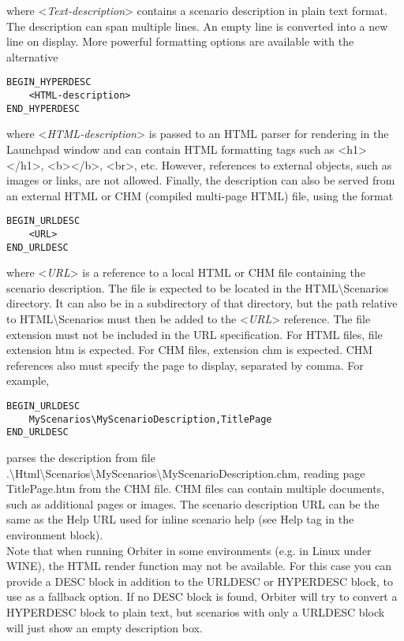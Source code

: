 \documentclass[Orbiter Developer Manual.tex]{subfiles}
\begin{document}
\noindent
where <\textit{Text-description}> contains a scenario description in plain text format. The description can span multiple lines. An empty line is converted into a new line on display. More powerful formatting options are available with the alternative

\begin{lstlisting}[language=OSFS]
BEGIN_HYPERDESC
	<HTML-description>
END_HYPERDESC
\end{lstlisting}

\noindent
where <\textit{HTML-description}> is passed to an HTML parser for rendering in the Launchpad window and can contain HTML formatting tags such as <h1></h1>, <b></b>, <br>, etc. However, references to external objects, such as images or links, are not allowed.
Finally, the description can also be served from an external HTML or CHM (compiled multi-page HTML) file, using the format

\begin{lstlisting}[language=OSFS]
BEGIN_URLDESC
	<URL>
END_URLDESC
\end{lstlisting}

\noindent
where <\textit{URL}> is a reference to a local HTML or CHM file containing the scenario description. The file is expected to be located in the HTML\textbackslash Scenarios directory. It can also be in a subdirectory of that directory, but the path relative to HTML\textbackslash Scenarios must then be added to the <\textit{URL}> reference. The file extension must not be included in the URL specification. For HTML files, file extension htm is expected. For CHM files, extension chm is expected. CHM references also must specify the page to display, separated by comma. For example,

\begin{lstlisting}[language=OSFS]
BEGIN_URLDESC
	MyScenarios\MyScenarioDescription,TitlePage
END_URLDESC
\end{lstlisting}

\noindent
parses the description from file .\textbackslash Html\textbackslash Scenarios\textbackslash MyScenarios\textbackslash MyScenarioDescription.chm, reading page TitlePage.htm from the CHM file. CHM files can contain multiple documents, such as additional pages or images. The scenario description URL can be the same as the Help URL used for inline scenario help (see Help tag in the environment block).\\
Note that when running Orbiter in some environments (e.g. in Linux under WINE), the HTML render function may not be available. For this case you can provide a DESC block in addition to the URLDESC or HYPERDESC block, to use as a fallback option. If no DESC block is found, Orbiter will try to convert a HYPERDESC block to plain text, but scenarios with only a URLDESC block will just show an empty description box.
\end{document}

